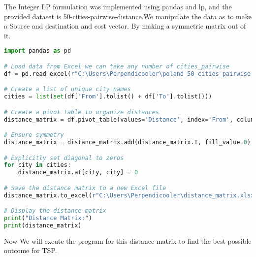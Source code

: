 The Integer LP formulation was implemented using pandas and lp, and the provided dataset is 50-cities-pairwise-distance.We manipulate the data as to make a Source and destination and cost vector. By making a symmetric matrix out of it.
\begin{center}
    \begin{lstlisting}[language = Python]
        import pandas as pd

# Load data from Excel we can take any number of cities_pairwise 
df = pd.read_excel(r"C:\Users\Perpendicooler\poland_50_cities_pairwise_distances.xlsx")

# Create a list of unique city names
cities = list(set(df['From'].tolist() + df['To'].tolist()))

# Create a pivot table to organize distances
distance_matrix = df.pivot_table(values='Distance', index='From', columns='To', aggfunc='first')

# Ensure symmetry
distance_matrix = distance_matrix.add(distance_matrix.T, fill_value=0)

# Explicitly set diagonal to zeros
for city in cities:
    distance_matrix.at[city, city] = 0

# Save the distance matrix to a new Excel file
distance_matrix.to_excel(r"C:\Users\Perpendicooler\distance_matrix.xlsx")

# Display the distance matrix
print("Distance Matrix:")
print(distance_matrix)

    \end{lstlisting}
\end{center}
Now We will excute the program for this distance matrix to find the best possible outcome for TSP.
